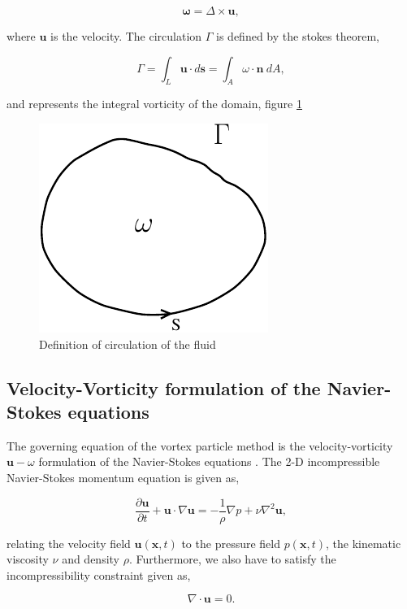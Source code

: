 	\begin{equation}
	\mathbf{\omega} = \Delta \times \mathbf{u},
	\end{equation}

where $\mathbf{u}$ is the velocity. The circulation $\Gamma$ is defined by the stokes theorem,

	\begin{equation}
	\Gamma = \int_L\mathbf{u}\cdot d \mathbf{s}=\int_A\omega\cdot\mathbf{n}\ dA,
	\label{eq:definitionOfCirculation}
	\end{equation}

and represents the integral vorticity of the domain, figure \ref{fig:vorticityCirculation}

	\begin{figure}[t]
	\centering
	\includegraphics[width=0.3\linewidth]{./figures/lagrangian/vorticityCirculation.pdf}
	\caption{Definition of circulation of the fluid}
	\label{fig:vorticityCirculation}
	\end{figure}

 
\subsection{Velocity-Vorticity formulation of the Navier-Stokes equations}
The governing equation of the vortex particle method is the velocity-vorticity $\mathbf{u}-\omega$ formulation of the Navier-Stokes equations \cite{Cottet2000a}. The 2-D incompressible Navier-Stokes momentum equation is given as,

	\begin{equation}
	\frac{\partial \mathbf{u}}{\partial t} + \mathbf{u}\cdot\nabla\mathbf{u} = - \frac{1}{\rho} \nabla p + \nu \nabla^2\mathbf{u},
	\label{eq:mom}
	\end{equation}

relating the velocity field $\mathbf{u}\left(\mathbf{x},t\right)$ to the pressure field $p\left(\mathbf{x},t\right)$, the kinematic viscosity $\nu$ and density $\rho$. Furthermore, we also have to satisfy the incompressibility constraint given as, 

	\begin{equation}
	\nabla\cdot\mathbf{u} = 0.
	\end{equation}

